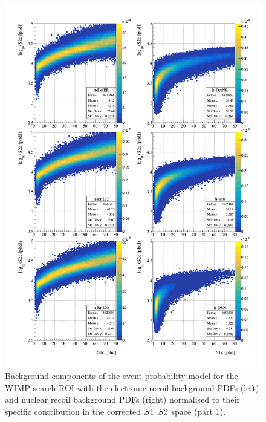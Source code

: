 %
\begin{figure}[h!]
    \centering
    \includegraphics[scale=0.7]{Chapter_5/Figures/sensitivity_studies/background_pdfs_1.pdf}
    \caption[Background components of the event probability model for the WIMP search ROI (1).]%
    {Background components of the event probability model for the WIMP search ROI with the electronic recoil background PDFs (left) and nuclear recoil background PDFs (right) normalised to their specific contribution in the corrected $S1\text{--}{}S2$ space (part 1).}
    \label{fig:lz_background_pdfs}
\end{figure}
%
